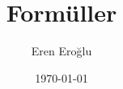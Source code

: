 \documentclass[a4paper, 10pt]{report}
\author{Eren Eroğlu}
\date{\today}
\title{Formüller}
\begin{document}
    \newtheorem*{theorem}{Teori}
    \theoremstyle{definition}
    \newtheorem*{definition}{Tanım}
    \maketitle
    \tableofcontents
    
    
    
    
\end{document}
